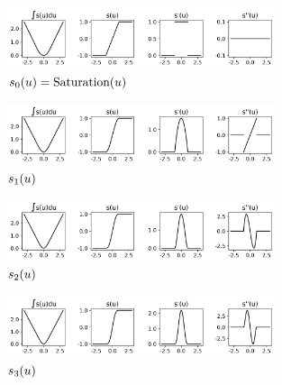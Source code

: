 \documentclass{article}
\begin{document}
\begin{figure}[h!]
    \centering
    \includegraphics[width=0.7\textwidth]{./figs/nn/sig/poly0.png}
    \caption{$s_0(u)=\text{Saturation}(u)$}
    \label{fig:poly0}
\end{figure}
\begin{figure}[h!]
    \centering
    \includegraphics[width=0.7\textwidth]{./figs/nn/sig/poly1.png}
    \caption{$s_1(u)$}
    \label{fig:poly1}
\end{figure}
\begin{figure}[h!]
    \centering
    \includegraphics[width=0.7\textwidth]{./figs/nn/sig/poly2.png}
    \caption{$s_2(u)$}
    \label{fig:poly2}
\end{figure}
\begin{figure}[h!]
    \centering
    \includegraphics[width=0.7\textwidth]{./figs/nn/sig/poly3.png}
    \caption{$s_3(u)$}
    \label{fig:poly3}
\end{figure}
\end{document}
